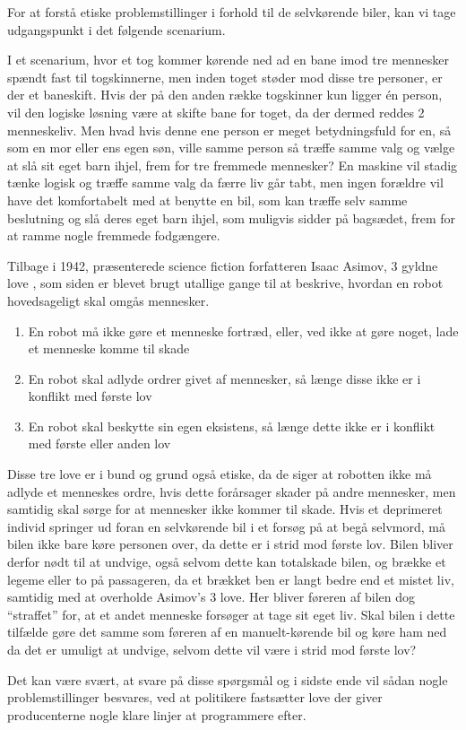 	For at forstå etiske problemstillinger i forhold til de selvkørende biler, kan vi tage udgangspunkt i det følgende scenarium.

	I et scenarium, hvor et tog kommer kørende ned ad en bane imod tre mennesker spændt fast til togskinnerne, men inden toget støder mod disse tre personer, er der et baneskift. Hvis der på den anden række togskinner kun ligger \'en person, vil den logiske løsning være at skifte bane for toget, da der dermed reddes 2 menneskeliv. Men hvad hvis denne ene person er meget betydningsfuld for en, så som en mor eller ens egen søn, ville samme person så træffe samme valg og vælge at slå sit eget barn ihjel, frem for tre fremmede mennesker? En maskine vil stadig tænke logisk og træffe samme valg da færre liv går tabt, men ingen forældre vil have det komfortabelt med at benytte en bil, som kan træffe selv samme beslutning og slå deres eget barn ihjel, som muligvis sidder på bagsædet, frem for at ramme nogle fremmede fodgængere.
	
	Tilbage i 1942, præsenterede science fiction forfatteren Isaac Asimov, 3 gyldne love \cite{Asimov}, som siden er blevet brugt utallige gange til at beskrive, hvordan en robot hovedsageligt skal omgås mennesker.
	
	\begin{enumerate}
		
		\item En robot må ikke gøre et menneske fortræd, eller, ved ikke at gøre noget, lade et menneske komme til skade
		\item En robot skal adlyde ordrer givet af mennesker, så længe disse ikke er i konflikt med første lov
		\item En robot skal beskytte sin egen eksistens, så længe dette ikke er i konflikt med første eller anden lov
		
	\end{enumerate}
	
	Disse tre love er i bund og grund også etiske, da de siger at robotten ikke må adlyde et menneskes ordre, hvis dette forårsager skader på andre mennesker, men samtidig skal sørge for at mennesker ikke kommer til skade. Hvis et deprimeret individ springer ud foran en selvkørende bil i et forsøg på at begå selvmord, må bilen ikke bare køre personen over, da dette er i strid mod første lov. Bilen bliver derfor nødt til at undvige, også selvom dette kan totalskade bilen, og brække et legeme eller to på passageren, da et brækket ben er langt bedre end et mistet liv, samtidig med at overholde Asimov's 3 love. Her bliver føreren af bilen dog ``straffet'' for, at et andet menneske forsøger at tage sit eget liv. Skal bilen i dette tilfælde gøre det samme som føreren af en manuelt-kørende bil og køre ham ned da det er umuligt at undvige, selvom dette vil være i strid mod første lov? 

	Det kan være svært, at svare på disse spørgsmål og i sidste ende vil sådan nogle problemstillinger besvares, ved at politikere fastsætter love der giver producenterne nogle klare linjer at programmere efter.